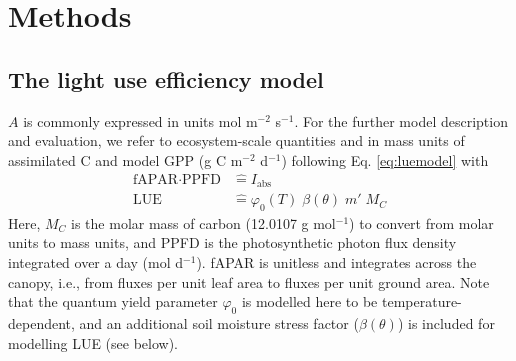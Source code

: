 \documentclass{myreport}
\begin{document}
\section{Methods}
\label{sec:methods}

\subsection{The light use efficiency model}
\label{sec:luemodel}
$A$ is commonly expressed in units mol m$^{-2}$ s$^{-1}$. For the further model description and evaluation, we refer to ecosystem-scale quantities and in mass units of assimilated C and model GPP (g C m$^{-2}$ d$^{-1}$) following Eq. \ref{eq:luemodel}
with 
\begin{align}
    \text{fAPAR} \cdot \text{PPFD} &\mathrel{\widehat{=}} I_{\text{abs}} \\
    \label{eq:lue_identification}
    \text{LUE} &\mathrel{\widehat{=}} \varphi_0(T) \; \beta(\theta) \; m' \; M_C
\end{align}
Here, $M_C$ is the molar mass of carbon (12.0107 g mol$^{-1}$) to convert from molar units to mass units, and PPFD is the photosynthetic photon flux density integrated over a day (mol d$^{-1}$). fAPAR is unitless and integrates across the canopy, i.e., from fluxes per unit leaf area to fluxes per unit ground area. Note that the quantum yield parameter $\varphi_0$ is modelled here to be temperature-dependent, and an additional soil moisture stress factor ($\beta (\theta)$) is included for modelling LUE (see below).
\end{document}
